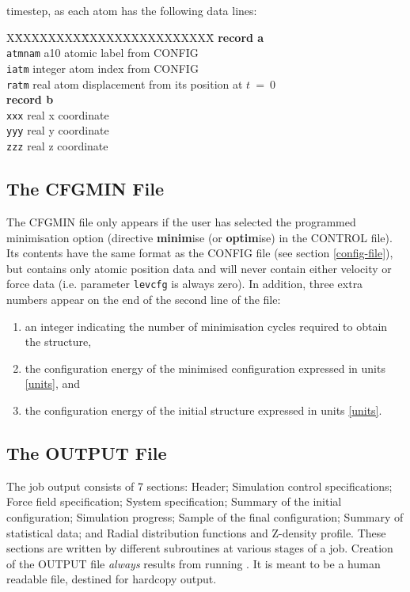 timestep, as each atom has the following data lines:
\begin{tabbing}
X\=XXXXXXXX\=XXXXXXXXXXXXXXXX\=\kill
{\bf record a}  \\
\> {\tt atmnam} \> a10     \> atomic label from CONFIG \\
\> {\tt iatm}   \> integer \> atom index from CONFIG \\
\> {\tt ratm}   \> real    \> atom displacement from its position at $t~=~0$ \\
{\bf record b} \\
\> {\tt xxx}    \> real    \> x coordinate \\
\> {\tt yyy}    \> real    \> y coordinate \\
\> {\tt zzz}    \> real    \> z coordinate \\
\end{tabbing}

\subsection{The CFGMIN File}
\label{cfgminfile}

The CFGMIN file only appears if the user has selected the programmed
minimisation option (directive {\bf minim}ise (or {\bf optim}ise)
in the CONTROL file).  Its contents have the same format as the
CONFIG file (see section \ref{config-file}), but contains only atomic
position data and will never contain either velocity or force data
(i.e. parameter {\tt levcfg} is always zero).  In addition, three
extra numbers appear on the end of the second line of the file:
\begin{enumerate}
\item an integer indicating the number of minimisation cycles
required to obtain the structure,
\item the configuration energy of the minimised configuration expressed
in \D units \ref{units}, and
\item the configuration energy of the initial structure expressed
in \D units \ref{units}.
\end{enumerate}

\subsection{The OUTPUT File}
\label{output-file}

The job output consists of 7 sections: Header; Simulation control
specifications; Force field specification; System specification;
Summary of the initial configuration; Simulation progress; Sample of
the final configuration; Summary of statistical data; and Radial
distribution functions and Z-density profile.  These sections are
written by different subroutines at various stages of a job.
Creation of the OUTPUT file {\em always} results from running \D. It
is meant to be a human readable file, destined for hardcopy output.

